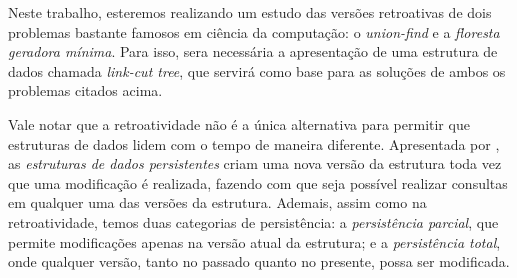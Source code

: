 Neste trabalho, esteremos realizando um estudo das versões retroativas de dois problemas bastante famosos em ciência da computação: o \emph{union-find} e a \emph{floresta geradora mínima}. Para isso, sera necessária a apresentação de uma estrutura de dados chamada \emph{link-cut tree}, que servirá como base para as soluções de ambos os problemas citados acima.



Vale notar que a retroatividade não é a única alternativa para permitir que estruturas de dados lidem com o tempo de maneira diferente. Apresentada por \citet{sarnak1986persistent}, as \emph{estruturas de dados persistentes} criam uma nova versão da estrutura toda vez que uma modificação é realizada, fazendo com que seja possível realizar consultas em qualquer uma das versões da estrutura. Ademais, assim como na retroatividade, temos duas categorias de persistência: a \emph{persistência parcial}, que permite modificações apenas na versão atual da estrutura; e a \emph{persistência total}, onde qualquer versão, tanto no passado quanto no presente, possa ser modificada.